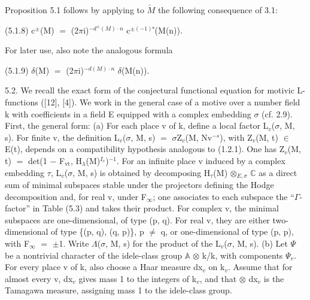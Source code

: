 \documentclass[10pt,twoside]{article}
\begin{document}
Proposition 5.1 follows by applying to \ensuremath{\check{M}} the following consequence of 3.1:\par
(5.1.8)    c\ensuremath{^{±}}(M) \ensuremath{=} (2\ensuremath{π}i)\ensuremath{^{−d^±(M)·n}} c\ensuremath{^{±(−1)ⁿ}}(M(n)).\par
For later use, also note the analogous formula\par
(5.1.9)    \ensuremath{δ}(M) \ensuremath{=} (2\ensuremath{π}i)\ensuremath{^{−d(M)·n}} \ensuremath{δ}(M(n)).\par
5.2. We recall the exact form of the conjectural functional equation for motivic L-functions ([12], [4]). We work in the general case of a motive over a number field k with coefficients in a field E equipped with a complex embedding \ensuremath{σ} (cf. 2.9). First, the general form: (a) For each place v of k, define a local factor L\ensuremath{_{v}}(\ensuremath{σ}, M, s). For finite v, the definition L\ensuremath{_{v}}(\ensuremath{σ}, M, s) \ensuremath{=} \ensuremath{σ}Z\ensuremath{_{v}}(M, Nv\ensuremath{^{−s}}), with Z\ensuremath{_{v}}(M, t) \ensuremath{∈} E(t), depends on a compatibility hypothesis analogous to (1.2.1). One has Z\ensuremath{_{v}}(M, t) \ensuremath{=} det(1 \ensuremath{−} F\ensuremath{_{\mathrm{vt}}}, H\ensuremath{_{λ}}(M)\ensuremath{^{I_v}})\ensuremath{^{-1}}. For an infinite place v induced by a complex embedding \ensuremath{τ}, L\ensuremath{_{v}}(\ensuremath{σ}, M, s) is obtained by decomposing H\ensuremath{_{τ}}(M) \ensuremath{⊗}\ensuremath{_{E,σ}} \ensuremath{ℂ} as a direct sum of minimal subspaces stable under the projectors defining the Hodge decomposition and, for real v, under F\ensuremath{_{∞}}; one associates to each subspace the “\ensuremath{Γ}-factor” in Table (5.3) and takes their product. For complex v, the minimal subspaces are one-dimensional, of type (p, q). For real v, they are either two-dimensional of type \{(p, q), (q, p)\}, p \ensuremath{≠} q, or one-dimensional of type (p, p), with F\ensuremath{_{∞}} \ensuremath{=} \ensuremath{±}1. Write \ensuremath{Λ}(\ensuremath{σ}, M, s) for the product of the L\ensuremath{_{v}}(\ensuremath{σ}, M, s). (b) Let \ensuremath{Ψ} be a nontrivial character of the idele-class group \ensuremath{𝔸} \ensuremath{⊗} k/k, with components \ensuremath{Ψ}\ensuremath{_{v}}. For every place v of k, also choose a Haar measure dx\ensuremath{_{v}} on k\ensuremath{_{v}}. Assume that for almost every v, dx\ensuremath{_{v}} gives mass 1 to the integers of k\ensuremath{_{v}}, and that \ensuremath{⊗} dx\ensuremath{_{v}} is the Tamagawa measure, assigning mass 1 to the idele-class group.\par
\end{document}
